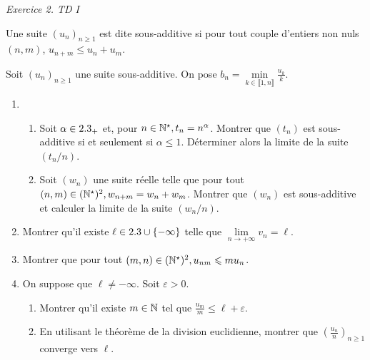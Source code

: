 \emph{Exercice 2. TD I \cite{acamanes}}\\

\begin{tcolorbox}
    Une suite $(u_n)_{n\geqslant1}$ est dite sous-additive si pour tout couple d'entiers non nuls $(n, m)$, $u_{n+m} \leqslant u_n + u_m$.
\end{tcolorbox}

\begin{exercice}
    Soit $(u_n)_{n \geqslant 1}$ une suite sous-additive. On pose $b_n = \min\limits_{k \in \llbracket 1, n \rrbracket} \frac{u_k}{k}$.
    \begin{enumerate}
        \item \begin{enumerate}
            \item Soit $\alpha \in 2.3_+$ et, pour $n \in \mathbb{N}^\star, t_n = n^{\alpha}$. Montrer que $(t_n)$ est sous-additive si et seulement si $\alpha \leqslant 1$. Déterminer alors la limite de la suite $(t_n/n)$.
            \item Soit $(w_n)$ une suite réelle telle que pour tout $(n,m) \in (\mathbb{N}^\star)^2, w_{n+m} = w_n + w_m$. Montrer que $(w_n)$ est sous-additive et calculer la limite de la suite $(w_n / n)$.
        \end{enumerate}
        \item Montrer qu'il existe $\ell \in 2.3 \cup \{ - \infty \}$ telle que $\lim\limits_{n \to +\infty} v_n = \ell$.
        \item Montrer que pour tout $(m,n) \in (\mathbb{N}^\star)^2, u_{nm} \leqslant m u_n$.
        \item On suppose que $\ell \not= - \infty$. Soit $\varepsilon > 0$.
        \begin{enumerate}
            \item Montrer qu'il existe $m \in \mathbb{N}$ tel que $\frac{u_m}{m} \leqslant \ell + \varepsilon$. 
            \item En utilisant le théorème de la division euclidienne, montrer que $\left( \frac{u_n}{n} \right)_{n \geqslant 1}$ converge vers $\ell$.
        \end{enumerate}
    \end{enumerate}
\end{exercice}

